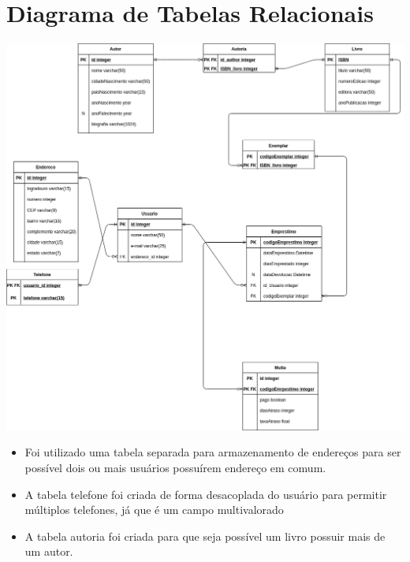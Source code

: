 \documentclass{article}
\begin{document}
\section*{Diagrama de Tabelas Relacionais}
\includegraphics[height=\hsize]{../docs/MR.png}
\begin{itemize}
    \item Foi utilizado uma tabela separada para armazenamento de endereços para ser possível dois ou mais usuários possuírem endereço em comum.
    \item A tabela telefone foi criada de forma desacoplada do usuário para permitir múltiplos telefones, já que é um campo multivalorado
    \item A tabela autoria foi criada para que seja possível um livro possuir mais de um autor.
\end{itemize} 
  
    
\end{document}
